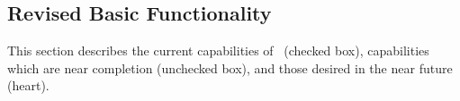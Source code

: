 \subsection{Revised Basic Functionality}

This section describes the current capabilities of \magnus\ (checked
box), capabilities which are near completion (unchecked box), and
those desired in the near future (heart).



